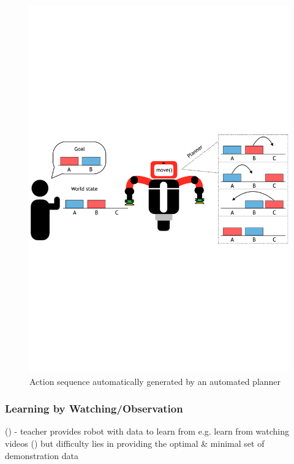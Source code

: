 \begin{figure}[h]
	\centering
	\includegraphics[scale=0.6]{figures/PbD-AutomatedPlanner}
	\caption{Action sequence automatically generated by an automated planner}
	\label{fig:Automated Planner}
\end{figure}

\subsubsection{Learning by Watching/Observation}\label{sssec:LbObservation}
(\cite{kuniyoshi1994learning})
- teacher provides robot with data to learn from e.g.
 learn from watching videos (\cite{Yang2015})
but difficulty lies in providing the optimal \& minimal set of demonstration data
 